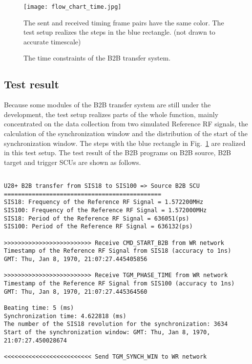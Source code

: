 \begin{landscape}
\begin{figure}[!htb]
   \centering   
   \texttt{[image: flow\_chart\_time.jpg]}
   \caption{The time constraints of the B2B transfer system.}{The sent and received timing frame pairs have the same color. The test setup realizes the steps in the blue rectangle. (not drawn to accurate timescale) }
   \label{time_constraint}
\end{figure}
\end{landscape}

\subsection{Test result}
Because some modules of the B2B transfer system are still under the development, the test setup realizes parts of the whole function, mainly concentrated on the data collection from two simulated Reference RF signals, the calculation of the synchronization window and the distribution of the start of the synchronization window. The steps with the blue rectangle in Fig.~\ref{time_constraint} are realized in this test setup. The test result of the B2B programs on B2B source, B2B target and trigger SCUs are shown as follows. 

\begin{lstlisting}[language={[ANSI]C}, keywordstyle=\color{blue!70}, commentstyle=\color{red!50!green!50!blue!50}, frame=shadowbox, rulesepcolor=\color{red!20!green!20!blue!20}]

U28+ B2B transfer from SIS18 to SIS100 => Source B2B SCU
=============================================
SIS18: Frequency of the Reference RF Signal = 1.572200MHz
SIS100: Frequency of the Reference RF Signal = 1.572000MHz 
SIS18: Period of the Reference RF Signal = 636051(ps)
SIS100: Period of the Reference RF Signal = 636132(ps)

>>>>>>>>>>>>>>>>>>>>>>>>> Receive CMD_START_B2B from WR network
Timestamp of the Reference RF Signal from SIS18 (accuracy to 1ns)
GMT: Thu, Jan 8, 1970, 21:07:27.445405856

>>>>>>>>>>>>>>>>>>>>>>>>> Receive TGM_PHASE_TIME from WR network
Timestamp of the Reference RF Signal from SIS100 (accuracy to 1ns)
GMT: Thu, Jan 8, 1970, 21:07:27.445364560

Beating time: 5 (ms)
Synchronization time: 4.622818 (ms)
The number of the SIS18 revolution for the synchronization: 3634
Start of the synchronization window: GMT: Thu, Jan 8, 1970, 21:07:27.450028674

<<<<<<<<<<<<<<<<<<<<<<<<< Send TGM_SYNCH_WIN to WR network
\end{lstlisting}

